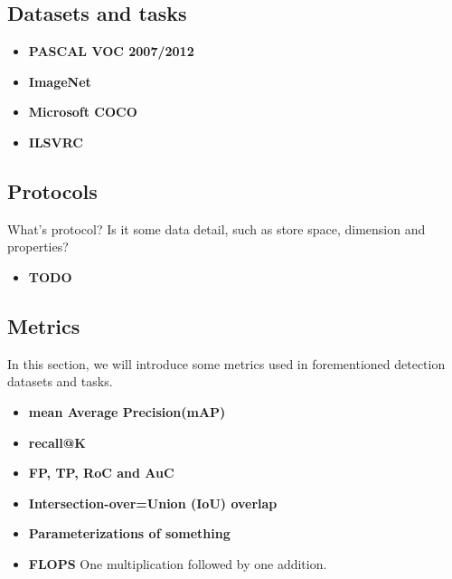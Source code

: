 

\subsection{Datasets and tasks}

\begin{itemize}
    \item \textbf{PASCAL VOC 2007/2012}

    \item \textbf{ImageNet}

    \item \textbf{Microsoft COCO}

    \item \textbf{ILSVRC}
\end{itemize}

\subsection{Protocols}

What's protocol? Is it some data detail, such as store space, 
dimension and properties?

\begin{itemize}
    \item \textbf{TODO}
\end{itemize}


\subsection{Metrics}

In this section, we will introduce some metrics used in forementioned 
detection datasets and tasks. 

\begin{itemize}

    \item \textbf{mean Average Precision(mAP)} 

    \item \textbf{recall@K} 

    \item \textbf{FP, TP, RoC and AuC}

    \item \textbf{Intersection-over=Union (IoU) overlap}

    \item \textbf{Parameterizations of something}

    \item \textbf{FLOPS} One multiplication followed by 
    one addition.

    \end{itemize}
    
